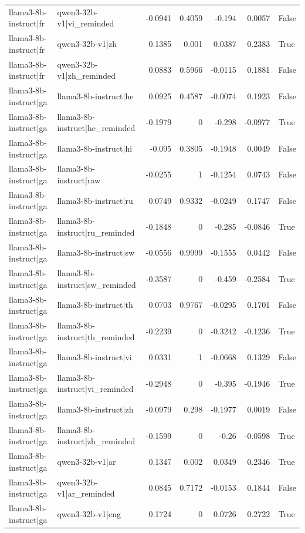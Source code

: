 \begin{table}
\begin{tabular}{l l r r r r l}
llama3-8b-instruct|fr & qwen3-32b-v1|vi_reminded & -0.0941 & 0.4059 & -0.194 & 0.0057 & False \\
llama3-8b-instruct|fr & qwen3-32b-v1|zh & 0.1385 & 0.001 & 0.0387 & 0.2383 & True \\
llama3-8b-instruct|fr & qwen3-32b-v1|zh_reminded & 0.0883 & 0.5966 & -0.0115 & 0.1881 & False \\
llama3-8b-instruct|ga & llama3-8b-instruct|he & 0.0925 & 0.4587 & -0.0074 & 0.1923 & False \\
llama3-8b-instruct|ga & llama3-8b-instruct|he_reminded & -0.1979 & 0 & -0.298 & -0.0977 & True \\
llama3-8b-instruct|ga & llama3-8b-instruct|hi & -0.095 & 0.3805 & -0.1948 & 0.0049 & False \\
llama3-8b-instruct|ga & llama3-8b-instruct|raw & -0.0255 & 1 & -0.1254 & 0.0743 & False \\
llama3-8b-instruct|ga & llama3-8b-instruct|ru & 0.0749 & 0.9332 & -0.0249 & 0.1747 & False \\
llama3-8b-instruct|ga & llama3-8b-instruct|ru_reminded & -0.1848 & 0 & -0.285 & -0.0846 & True \\
llama3-8b-instruct|ga & llama3-8b-instruct|sw & -0.0556 & 0.9999 & -0.1555 & 0.0442 & False \\
llama3-8b-instruct|ga & llama3-8b-instruct|sw_reminded & -0.3587 & 0 & -0.459 & -0.2584 & True \\
llama3-8b-instruct|ga & llama3-8b-instruct|th & 0.0703 & 0.9767 & -0.0295 & 0.1701 & False \\
llama3-8b-instruct|ga & llama3-8b-instruct|th_reminded & -0.2239 & 0 & -0.3242 & -0.1236 & True \\
llama3-8b-instruct|ga & llama3-8b-instruct|vi & 0.0331 & 1 & -0.0668 & 0.1329 & False \\
llama3-8b-instruct|ga & llama3-8b-instruct|vi_reminded & -0.2948 & 0 & -0.395 & -0.1946 & True \\
llama3-8b-instruct|ga & llama3-8b-instruct|zh & -0.0979 & 0.298 & -0.1977 & 0.0019 & False \\
llama3-8b-instruct|ga & llama3-8b-instruct|zh_reminded & -0.1599 & 0 & -0.26 & -0.0598 & True \\
llama3-8b-instruct|ga & qwen3-32b-v1|ar & 0.1347 & 0.002 & 0.0349 & 0.2346 & True \\
llama3-8b-instruct|ga & qwen3-32b-v1|ar_reminded & 0.0845 & 0.7172 & -0.0153 & 0.1844 & False \\
llama3-8b-instruct|ga & qwen3-32b-v1|eng & 0.1724 & 0 & 0.0726 & 0.2722 & True \\

\end{tabular}
\end{table}
